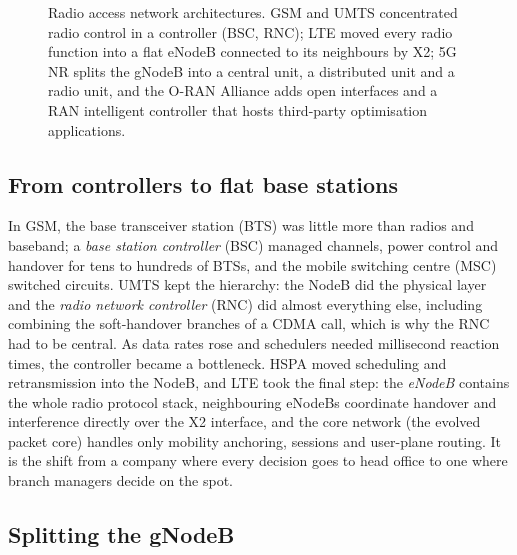 \begin{figure}[htbp]
\caption{Radio access network architectures. GSM and UMTS concentrated radio control in a controller (BSC, RNC); LTE moved
every radio function into a flat eNodeB connected to its neighbours by X2; 5G NR splits the gNodeB into a central unit, a
distributed unit and a radio unit, and the O-RAN Alliance adds open interfaces and a RAN intelligent controller that hosts
third-party optimisation applications.}
\label{fig:ch20_ran}
\end{figure}

\subsection{From controllers to flat base stations}

In GSM, the base transceiver station (BTS) was little more than radios and baseband; a \emph{base station controller}
(BSC) managed channels, power control and handover for tens to hundreds of BTSs, and the mobile switching centre (MSC)
switched circuits. UMTS kept the hierarchy: the NodeB did the physical layer and the \emph{radio network controller}
(RNC) did almost everything else, including combining the soft-handover branches of a CDMA call, which is why the RNC had
to be central. As data rates rose and schedulers needed millisecond reaction times, the controller became a bottleneck.
HSPA moved scheduling and retransmission into the NodeB, and LTE took the final step: the \emph{eNodeB} contains the whole
radio protocol stack, neighbouring eNodeBs coordinate handover and interference directly over the X2 interface, and the
core network (the evolved packet core) handles only mobility anchoring, sessions and user-plane routing. It is the shift
from a company where every decision goes to head office to one where branch managers decide on the spot.

\subsection{Splitting the gNodeB}

